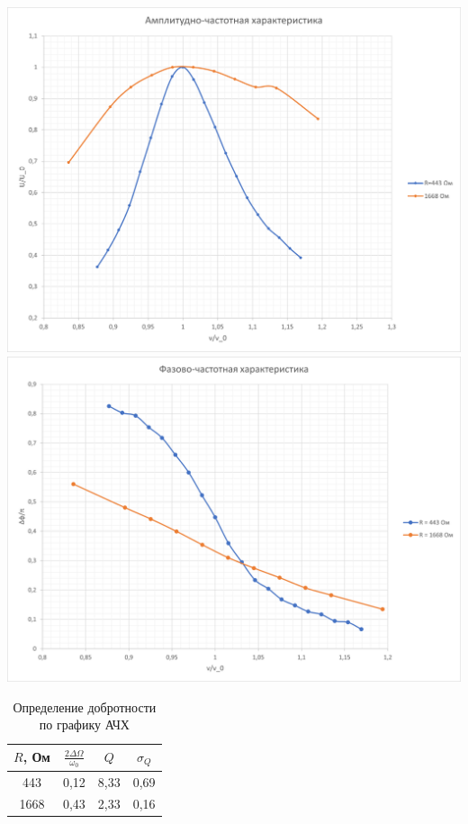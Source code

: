 \documentclass[a4paper, 12pt]{article}
\begin{document}
        \begin{center}
            \includegraphics[width = \textwidth]{img/Gr3.png}
            \includegraphics[width = \textwidth]{img/Gr4.png}
        \end{center}
        \newpage
        \begin{table}[h!]
            \centering
            \begin{tabular}{|c|c|c|c|}
                \hline
                $R$, Ом & $\frac{2\Delta \Omega}{\omega_0}$ & $Q$ & $\sigma_{Q}$ \\ \hline
                443 & 0,12 & 8,33 & 0,69\\ \hline
                1668 & 0,43 & 2,33 & 0,16 \\ \hline
            \end{tabular}
            \caption{Определение добротности по графику АЧХ}
        \end{table}
\end{document}
